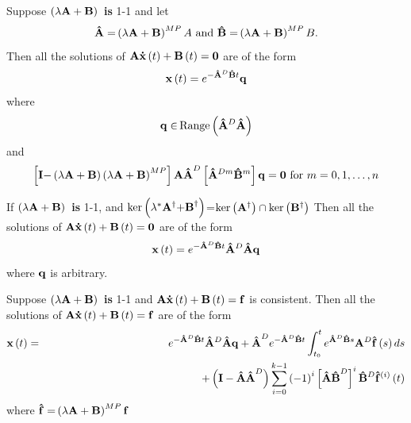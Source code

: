 \begin{theorem}
Suppose $\left( \lambda {\bf A+B}\right) {\bf \ }${\bf is }1-1 and let 
\begin{equation}
{\bf \hat{A}=}\left( \lambda {\bf A+B}\right) ^{MP}A\text{ and }{\bf \hat{B}=%
}\left( \lambda {\bf A+B}\right) ^{MP}B.
\end{equation}%
Then all the solutions of ${\bf A\dot{x}}\left( t\right) +{\bf B}\left(
t\right) ={\bf 0}$ are of the form 
\begin{equation}
{\bf x}\left( t\right) =e^{-{\bf \hat{A}}^{D}{\bf \hat{B}}t}{\bf q}
\end{equation}%
where 
\begin{equation}
{\bf q\in }%
\mathop{\rm Range}%
\left( {\bf \hat{A}}^{D}{\bf \hat{A}}\right)
\end{equation}
and 
\begin{equation}
\left[ {\bf I-}\left( \lambda {\bf A+B}\right) \left( \lambda {\bf A+B}%
\right) ^{MP}\right] {\bf A\hat{A}}^{D}\left[ {\bf \hat{A}}^{Dm}{\bf \hat{B}}%
^{m}\right] {\bf q=0}\text{ for }m=0,1,\ldots ,n
\end{equation}

\begin{corollary}
If $\left( \lambda {\bf A+B}\right) {\bf \ }${\bf is }1-1, and $\ker \left(
\lambda ^{\ast }{\bf A}^{\dagger }{\bf +B}^{\dagger }\right) $=$\ker \left( 
{\bf A}^{\dagger }\right) \cap \ker \left( {\bf B}^{\dagger }\right) $ Then
all the solutions of ${\bf A\dot{x}}\left( t\right) +{\bf B}\left( t\right) =%
{\bf 0}$ are of the form 
\begin{equation}
{\bf x}\left( t\right) =e^{-{\bf \hat{A}}^{D}{\bf \hat{B}}t}{\bf \hat{A}}^{D}%
{\bf \hat{A}q}
\end{equation}%
where ${\bf q}$ is arbitrary.

\begin{theorem}
Suppose $\left( \lambda {\bf A+B}\right) {\bf \ }${\bf is }1-1 and ${\bf A%
\dot{x}}\left( t\right) +{\bf B}\left( t\right) ={\bf f}$ is consistent.
Then all the solutions of ${\bf A\dot{x}}\left( t\right) +{\bf B}\left(
t\right) ={\bf f}$ are of the form 
\begin{eqnarray}
{\bf x}\left( t\right) &=&e^{-{\bf \hat{A}}^{D}{\bf \hat{B}}t}{\bf \hat{A}}%
^{D}{\bf \hat{A}q+\hat{A}}^{D}e^{-{\bf \hat{A}}^{D}{\bf \hat{B}}%
t}\int_{t_{0}}^{t}e^{{\bf \hat{A}}^{D}{\bf \hat{B}}s}{\bf A}^{D}{\bf \hat{f}}%
\left( s\right) ds  \nonumber \\
&&\qquad \qquad \qquad \qquad \qquad \qquad \qquad +\left( {\bf I}-{\bf 
\hat{A}\hat{A}}^{D}\right) \sum_{i=0}^{k-1}\left( -1\right) ^{i}\left[ {\bf 
\hat{A}\hat{B}}^{D}\right] ^{i}{\bf \hat{B}}^{D}{\bf \hat{f}}^{\left(
i\right) }\left( t\right)
\end{eqnarray}%
where ${\bf \hat{f}=}\left( \lambda {\bf A+B}\right) ^{MP}{\bf f}$
\end{theorem}


\end{corollary}
\end{theorem}
